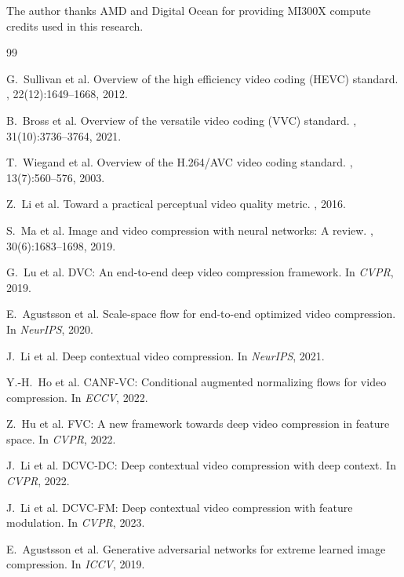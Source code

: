 \documentclass{article}
\begin{document}
The author thanks AMD and Digital Ocean for providing MI300X compute credits used in this research.

\begin{thebibliography}{99}

G.~Sullivan et al.
\newblock Overview of the high efficiency video coding (HEVC) standard.
, 22(12):1649--1668, 2012.

B.~Bross et al.
\newblock Overview of the versatile video coding (VVC) standard.
, 31(10):3736--3764, 2021.

T.~Wiegand et al.
\newblock Overview of the H.264/AVC video coding standard.
, 13(7):560--576, 2003.

Z.~Li et al.
\newblock Toward a practical perceptual video quality metric.
, 2016.

S.~Ma et al.
\newblock Image and video compression with neural networks: A review.
, 30(6):1683--1698, 2019.

G.~Lu et al.
\newblock DVC: An end-to-end deep video compression framework.
\newblock In {\em CVPR}, 2019.

E.~Agustsson et al.
\newblock Scale-space flow for end-to-end optimized video compression.
\newblock In {\em NeurIPS}, 2020.

J.~Li et al.
\newblock Deep contextual video compression.
\newblock In {\em NeurIPS}, 2021.

Y.-H.~Ho et al.
\newblock CANF-VC: Conditional augmented normalizing flows for video compression.
\newblock In {\em ECCV}, 2022.

Z.~Hu et al.
\newblock FVC: A new framework towards deep video compression in feature space.
\newblock In {\em CVPR}, 2022.

J.~Li et al.
\newblock DCVC-DC: Deep contextual video compression with deep context.
\newblock In {\em CVPR}, 2022.

J.~Li et al.
\newblock DCVC-FM: Deep contextual video compression with feature modulation.
\newblock In {\em CVPR}, 2023.

E.~Agustsson et al.
\newblock Generative adversarial networks for extreme learned image compression.
\newblock In {\em ICCV}, 2019.


\end{thebibliography}
\end{document}
